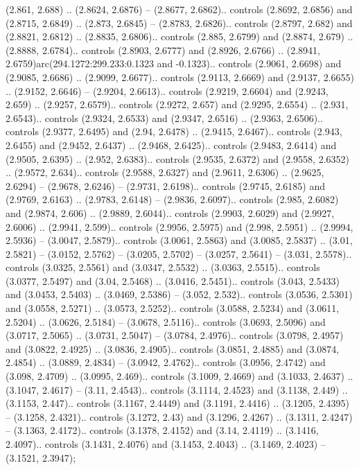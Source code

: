 (2.861, 2.688) .. (2.8624, 2.6876) -- (2.8677, 2.6862).. controls (2.8692, 2.6856) and (2.8715, 2.6849) .. (2.873, 2.6845) -- (2.8783, 2.6826).. controls (2.8797, 2.682) and (2.8821, 2.6812) .. (2.8835, 2.6806).. controls (2.885, 2.6799) and (2.8874, 2.679) .. (2.8888, 2.6784).. controls (2.8903, 2.6777) and (2.8926, 2.6766) .. (2.8941, 2.6759)arc(294.1272:299.233:0.1323 and -0.1323).. controls (2.9061, 2.6698) and (2.9085, 2.6686) .. (2.9099, 2.6677).. controls (2.9113, 2.6669) and (2.9137, 2.6655) .. (2.9152, 2.6646) -- (2.9204, 2.6613).. controls (2.9219, 2.6604) and (2.9243, 2.659) .. (2.9257, 2.6579).. controls (2.9272, 2.657) and (2.9295, 2.6554) .. (2.931, 2.6543).. controls (2.9324, 2.6533) and (2.9347, 2.6516) .. (2.9363, 2.6506).. controls (2.9377, 2.6495) and (2.94, 2.6478) .. (2.9415, 2.6467).. controls (2.943, 2.6455) and (2.9452, 2.6437) .. (2.9468, 2.6425).. controls (2.9483, 2.6414) and (2.9505, 2.6395) .. (2.952, 2.6383).. controls (2.9535, 2.6372) and (2.9558, 2.6352) .. (2.9572, 2.634).. controls (2.9588, 2.6327) and (2.9611, 2.6306) .. (2.9625, 2.6294) -- (2.9678, 2.6246) -- (2.9731, 2.6198).. controls (2.9745, 2.6185) and (2.9769, 2.6163) .. (2.9783, 2.6148) -- (2.9836, 2.6097).. controls (2.985, 2.6082) and (2.9874, 2.606) .. (2.9889, 2.6044).. controls (2.9903, 2.6029) and (2.9927, 2.6006) .. (2.9941, 2.599).. controls (2.9956, 2.5975) and (2.998, 2.5951) .. (2.9994, 2.5936) -- (3.0047, 2.5879).. controls (3.0061, 2.5863) and (3.0085, 2.5837) .. (3.01, 2.5821) -- (3.0152, 2.5762) -- (3.0205, 2.5702) -- (3.0257, 2.5641) -- (3.031, 2.5578).. controls (3.0325, 2.5561) and (3.0347, 2.5532) .. (3.0363, 2.5515).. controls (3.0377, 2.5497) and (3.04, 2.5468) .. (3.0416, 2.5451).. controls (3.043, 2.5433) and (3.0453, 2.5403) .. (3.0469, 2.5386) -- (3.052, 2.532).. controls (3.0536, 2.5301) and (3.0558, 2.5271) .. (3.0573, 2.5252).. controls (3.0588, 2.5234) and (3.0611, 2.5204) .. (3.0626, 2.5184) -- (3.0678, 2.5116).. controls (3.0693, 2.5096) and (3.0717, 2.5065) .. (3.0731, 2.5047) -- (3.0784, 2.4976).. controls (3.0798, 2.4957) and (3.0822, 2.4925) .. (3.0836, 2.4905).. controls (3.0851, 2.4885) and (3.0874, 2.4854) .. (3.0889, 2.4834) -- (3.0942, 2.4762).. controls (3.0956, 2.4742) and (3.098, 2.4709) .. (3.0995, 2.469).. controls (3.1009, 2.4669) and (3.1033, 2.4637) .. (3.1047, 2.4617) -- (3.11, 2.4543).. controls (3.1114, 2.4523) and (3.1138, 2.449) .. (3.1153, 2.447).. controls (3.1167, 2.4449) and (3.1191, 2.4416) .. (3.1205, 2.4395) -- (3.1258, 2.4321).. controls (3.1272, 2.43) and (3.1296, 2.4267) .. (3.1311, 2.4247) -- (3.1363, 2.4172).. controls (3.1378, 2.4152) and (3.14, 2.4119) .. (3.1416, 2.4097).. controls (3.1431, 2.4076) and (3.1453, 2.4043) .. (3.1469, 2.4023) -- (3.1521, 2.3947);



